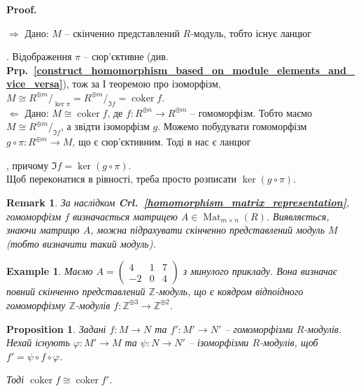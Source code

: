 \documentclass[a4paper, 10pt]{article}
\makeatletter
\def\rightproof{$\boxed{\Rightarrow}$ }
\def\leftproof{$\boxed{\Leftarrow}$ }
\theoremstyle{theoremdd}
\theoremstyle{theoremdd}
\theoremstyle{theoremdd}
\theoremstyle{theoremdd}
\theoremstyle{theoremdd}
\newtheorem{example}[theorem]{Example}
\theoremstyle{theoremdd}
\theoremstyle{theoremdd}
\theoremstyle{theoremdd}
\theoremstyle{theoremdd}
\newtheorem{proposition}[theorem]{Proposition}
\theoremstyle{theoremdd}
\theoremstyle{theoremdd}
\newtheorem{remark}[theorem]{Remark}
\theoremstyle{theoremdd}
\theoremstyle{theoremdd}
\theoremstyle{theoremdd}
\theoremstyle{theoremdd}
\renewenvironment{proof}[1][Proof.\\]{\par
\pushQED{\hfill \qed}%
\normalfont \topsep6\p@\@plus6\p@\relax
\trivlist
\item\relax
{\bfseries
#1\@addpunct{.}}\hspace\labelsep\ignorespaces
}{%
\popQED\endtrivlist\@endpefalse
}
\DeclareMathOperator{\Mat}{Mat}
\DeclareMathOperator{\coker}{coker}
\newcommand\prpref[1]{\textbf{Prp.~\ref{#1}}}
\newcommand\crlref[1]{\textbf{Crl.~\ref{#1}}}
\makeatother
\begin{document}
\begin{proof}
\rightproof Дано: $M$ -- скінченно представлений $R$-модуль, тобто існує ланцюг .
Відображення $\pi$ -- сюр'єктивне (див. \prpref{construct_homomorphism_based_on_module_elements_and_vice_versa}), тож за І теоремою про ізоморфізм, \\
$M \cong R^{\oplus m}/_{\ker \pi} = R^{\oplus m}/_{\Im f} = \coker f$.
\bigskip \\
\leftproof Дано: $M \cong \coker f$, де $f \colon R^{\oplus n} \to R^{\oplus m}$ -- гомоморфізм. Тобто маємо $M \cong R^{\oplus m}/_{\Im f}$, а звідти ізоморфізм $g$. Можемо побудувати гомоморфізм $g \circ \pi \colon R^{\oplus m} \to M$, що є сюр'єктивним. Тоді в нас є ланцюг , причому $\Im f = \ker (g \circ \pi)$.\\
Щоб переконатися в рівності, треба просто розписати $\ker (g \circ \pi)$.
\end{proof}

\begin{remark}
За наслідком \crlref{homomorphism_matrix_representation}, гомоморфізм $f$ визначається матрицею $A \in \Mat_{m \times n}(R)$. Виявляється, знаючи матрицю $A$, можна підрахувати скінченно представлений модуль $M$ (тобто визначити такий модуль).
\end{remark}

\begin{example}
Маємо $A = \begin{pmatrix}
4 & 1 & 7 \\
-2 & 0 & 4
\end{pmatrix}$ з минулого прикладу. Вона визначає повний скінченно представлений $\mathbb{Z}$-модуль, що є коядром відпоідного гомоморфізму $\mathbb{Z}$-модулів $f \colon \mathbb{Z}^{\oplus 3} \to \mathbb{Z}^{\oplus 2}$.
\end{example}

\begin{proposition}
Задані $f \colon M \to N$ та $f' \colon M' \to N'$ -- гомоморфізми $R$-модулів. Нехай існують $\varphi \colon M' \to M$ та $\psi \colon N \to N'$ -- ізоморфізми $R$-модулів, щоб $f' = \psi \circ f \circ \varphi$.
\begin{figure}[H]
\centering
{}
\end{figure}
Тоді $\coker f \cong \coker f'$.
\end{proposition}
\end{document}
